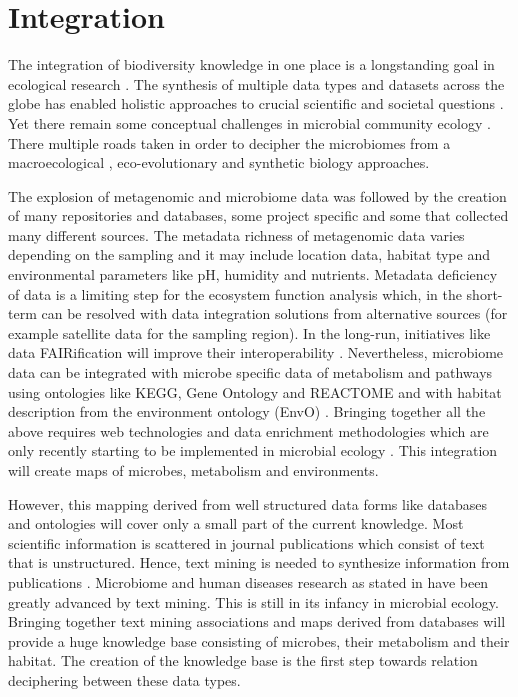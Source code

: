 \section{Integration}
\label{sec:integration}

The integration of biodiversity knowledge in one place is a longstanding
goal in ecological research \parencite{Walter_2012}. The synthesis of multiple
data types and datasets across the globe has enabled 
holistic approaches to crucial scientific and societal questions \parencite{heberling_j_mason_data_2021}.
Yet there remain some conceptual challenges in microbial community ecology \parencite{prosser2020Conceptual}.
There multiple roads taken in order to decipher the microbiomes from a macroecological \parencite{Mascarenhas2020}, 
eco-evolutionary \parencite{martiny2023Investigating, loreau2023Opportunities} and synthetic biology \parencite{Leggieri2021} approaches.

The explosion of metagenomic and microbiome data was followed by the creation
of many repositories and databases, some project specific and some that
collected many different sources. The metadata richness of metagenomic data
varies depending on the sampling and it may include location data, habitat type
and environmental parameters like pH, humidity and nutrients. Metadata
deficiency of data is a limiting step for the ecosystem function analysis
which, in the short-term can be resolved with data integration solutions from
alternative sources (for example satellite data for the sampling region). In
the long-run, initiatives like data FAIRification will improve their
interoperability \parencite{wilkinson2016the-fair}. Nevertheless, microbiome data can be integrated with microbe
specific data of metabolism and pathways using ontologies like KEGG, Gene
Ontology and REACTOME and with habitat description from the environment
ontology (EnvO) \parencite{buttigieg2016environment}. Bringing together all the above requires web technologies and
data enrichment methodologies which are only recently starting to be
implemented in microbial ecology \parencite{jiang2016Microbiome}. This integration
will create maps of microbes, metabolism and environments. 

However, this mapping derived from well structured data forms like databases
and ontologies will cover only a small part of the current knowledge. Most
scientific information is scattered in journal publications which consist of
text that is unstructured. Hence, text mining is needed to synthesize
information from publications \parencite{jensen2006Literature}. Microbiome and
human diseases research as stated in \parencite{badal2019Challenges} have been
greatly advanced by text mining. This is still in its infancy in microbial
ecology. Bringing together text mining associations and maps derived from
databases will provide a huge knowledge base consisting of microbes, their
metabolism and their habitat. The creation of the knowledge base is the first
step towards relation deciphering between these data types.

